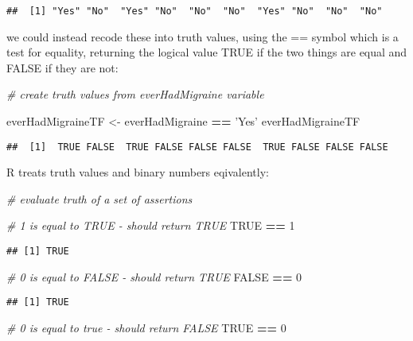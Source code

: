 \documentclass[]{book}
\newenvironment{Shaded}{\begin{snugshade}}{\end{snugshade}}
\newcommand{\DecValTok}[1]{\textcolor[rgb]{0.00,0.00,0.81}{#1}}
\newcommand{\StringTok}[1]{\textcolor[rgb]{0.31,0.60,0.02}{#1}}
\newcommand{\CommentTok}[1]{\textcolor[rgb]{0.56,0.35,0.01}{\textit{#1}}}
\newcommand{\OtherTok}[1]{\textcolor[rgb]{0.56,0.35,0.01}{#1}}
\newcommand{\OperatorTok}[1]{\textcolor[rgb]{0.81,0.36,0.00}{\textbf{#1}}}
\newcommand{\NormalTok}[1]{#1}
\theoremstyle{definition}
\theoremstyle{definition}
\theoremstyle{definition}
\theoremstyle{remark}
\begin{document}
\begin{verbatim}
##  [1] "Yes" "No"  "Yes" "No"  "No"  "No"  "Yes" "No"  "No"  "No"
\end{verbatim}

we could instead recode these into truth values, using the == symbol
which is a test for equality, returning the logical value TRUE if the
two things are equal and FALSE if they are not:

\begin{Shaded}
\begin{Highlighting}[]
\CommentTok{# create truth values from everHadMigraine variable}

\NormalTok{everHadMigraineTF <-}\StringTok{ }\NormalTok{everHadMigraine }\OperatorTok{==}\StringTok{ 'Yes'}
\NormalTok{everHadMigraineTF}
\end{Highlighting}
\end{Shaded}

\begin{verbatim}
##  [1]  TRUE FALSE  TRUE FALSE FALSE FALSE  TRUE FALSE FALSE FALSE
\end{verbatim}

R treats truth values and binary numbers eqivalently:

\begin{Shaded}
\begin{Highlighting}[]
\CommentTok{# evaluate truth of a set of assertions}

\CommentTok{# 1 is equal to TRUE - should return TRUE}
\OtherTok{TRUE} \OperatorTok{==}\StringTok{ }\DecValTok{1}
\end{Highlighting}
\end{Shaded}

\begin{verbatim}
## [1] TRUE
\end{verbatim}

\begin{Shaded}
\begin{Highlighting}[]
\CommentTok{# 0 is equal to FALSE - should return TRUE}
\OtherTok{FALSE} \OperatorTok{==}\StringTok{ }\DecValTok{0}
\end{Highlighting}
\end{Shaded}

\begin{verbatim}
## [1] TRUE
\end{verbatim}

\begin{Shaded}
\begin{Highlighting}[]
\CommentTok{# 0 is equal to true - should return FALSE}
\OtherTok{TRUE} \OperatorTok{==}\StringTok{ }\DecValTok{0}
\end{Highlighting}
\end{Shaded}
\end{document}
